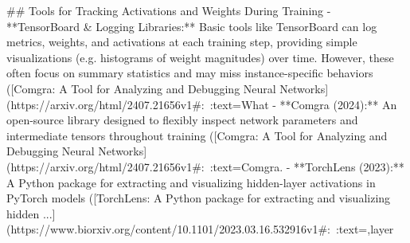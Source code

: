 ## Tools for Tracking Activations and Weights During Training
- **TensorBoard & Logging Libraries:** Basic tools like TensorBoard can log metrics, weights, and activations at each training step, providing simple visualizations (e.g. histograms of weight magnitudes) over time. However, these often focus on summary statistics and may miss instance-specific behaviors ([Comgra: A Tool for Analyzing and Debugging Neural Networks](https://arxiv.org/html/2407.21656v1#:~:text=What%
- **Comgra (2024):** An open-source library designed to flexibly inspect network parameters and intermediate tensors throughout training ([Comgra: A Tool for Analyzing and Debugging Neural Networks](https://arxiv.org/html/2407.21656v1#:~:text=Comgra.%
- **TorchLens (2023):** A Python package for extracting and visualizing hidden-layer activations in PyTorch models ([TorchLens: A Python package for extracting and visualizing hidden ...](https://www.biorxiv.org/content/10.1101/2023.03.16.532916v1#:~:text=,layer%

